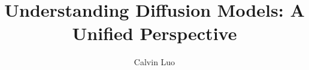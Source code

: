 \documentclass[14pt,aspectratio=169]{beamer}
\title{Understanding Diffusion Models: A Unified Perspective}
\author{Calvin Luo}
\institute[shortinst]{Google Research}
\begin{document}
{
\begin{frame}
  \titlepage
\end{frame}
}

\newcommand{\vx}{\boldsymbol{x}}
\newcommand{\vz}{\boldsymbol{z}}





















% 
% 
\end{document}
